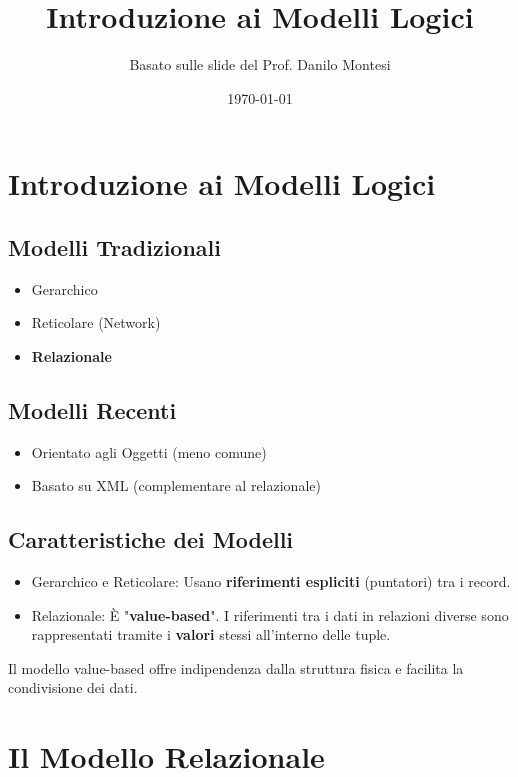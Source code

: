 \documentclass{article}
\title{Introduzione ai Modelli Logici}
\author{Basato sulle slide del Prof. Danilo Montesi}
\date{\today}
\begin{document}
	
	
	\maketitle
	\tableofcontents
	\newpage
	
	\section{Introduzione ai Modelli Logici}
	
	\subsection{Modelli Tradizionali}
	\begin{itemize}
		\item Gerarchico
		\item Reticolare (Network)
		\item \textbf{Relazionale}
	\end{itemize}
	
	\subsection{Modelli Recenti}
	\begin{itemize}
		\item Orientato agli Oggetti (meno comune)
		\item Basato su XML (complementare al relazionale)
	\end{itemize}
	
	\subsection{Caratteristiche dei Modelli}
	\begin{itemize}
		\item Gerarchico e Reticolare: Usano \textbf{riferimenti espliciti} (puntatori) tra i record.
		\item Relazionale: È "\textbf{value-based}". I riferimenti tra i dati in relazioni diverse sono rappresentati tramite i \textbf{valori} stessi all'interno delle tuple.
	\end{itemize}
	Il modello value-based offre indipendenza dalla struttura fisica e facilita la condivisione dei dati.
	
	\section{Il Modello Relazionale}
	
\end{document}
